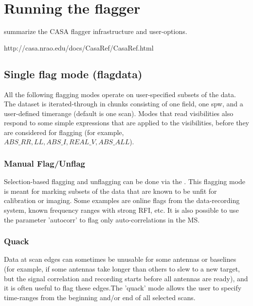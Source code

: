 
\section{Running the flagger}\label{Sec:Running}

summarize the CASA flagger infrastructure and user-options.

 {http://casa.nrao.edu/docs/CasaRef/CasaRef.html}


\subsection{Single flag mode (flagdata)}

All the following flagging modes operate on user-specified subsets of the data.
The dataset is iterated-through in chunks consisting of one field, one spw, and a
user-defined timerange (default is one scan). 
Modes that read visibilities also respond to some simple expressions that are applied to 
the visibilities, before they are considered for flagging 
(for example, $ABS\_RR,LL,  ABS\_I, REAL\_V,  ABS\_ALL$).

\subsubsection{Manual Flag/Unflag}

Selection-based flagging and unflagging can be done via the .  
This flagging mode is meant for marking subsets of the data that are known to be
unfit for calibration or imaging. Some examples are online flags from the data-recording system, known frequency ranges 
with strong RFI, etc. It is also possible to use the parameter 'autocorr' to
flag only auto-correlations in the MS.

\subsubsection{Quack}

Data at scan edges can sometimes be unusable for some antennas or baselines (for example, if some antennas take longer 
than others to slew to a new target, but the signal correlation and recording starts before all antennas are ready), and it 
is often useful to flag these edges.The 'quack' mode allows the user to specify time-ranges from the beginning and/or end of 
all selected scans. 

